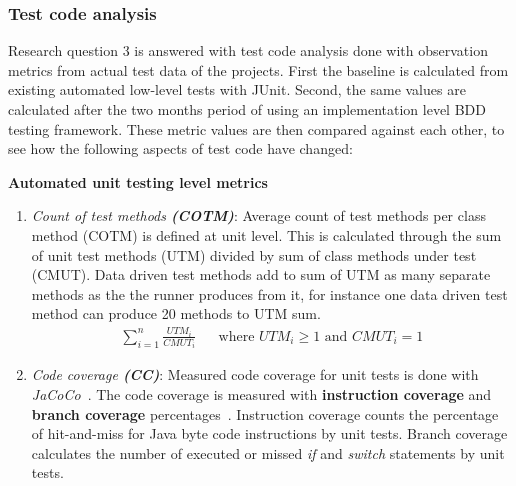     \subsubsection{Test code analysis}
    \label{subsub:test}
    Research question 3 is answered with test code analysis done with observation metrics from actual test data of the projects.
    First the baseline is calculated from existing automated low-level tests with JUnit. Second, the same values are calculated
    after the two months period of using an implementation level BDD testing framework. These metric values are then compared
    against each other, to see how the following aspects of test code have changed:
    \clearpage
    \begin{addmargin}[0em]{0em}
    \vspace{10px}
    \textbf{Automated unit testing level metrics}
    \vspace{5px}
    \newline
    \begin{enumerate}
    \item \textit{Count of test methods \textbf{(COTM)}}:
    Average count of test methods per class method (COTM) is defined at unit level. This is calculated through the sum
    of unit test methods (UTM) divided by sum of class methods under test (CMUT). Data driven test methods add to sum of UTM as
    many separate methods as the the runner produces from it, for instance one data driven test method can produce 20 methods to UTM sum.
    \begin{align*}
        \sum_{i=1}^{n}\frac{UTM_{i}}{CMUT_{i}} && \text {where } UTM_{i} \geq 1 \text{ and } CMUT_{i} = 1
    \end{align*}
    \item \textit{Code coverage \textbf{(CC)}}:
    Measured code coverage for unit tests is done with \textit{JaCoCo}~\cite{jacoco}. The code coverage is measured with
    \textbf{instruction coverage} and \textbf{branch coverage} percentages~\cite{jacoco-coverage}. Instruction coverage counts the percentage
    of hit-and-miss for Java byte code instructions by unit tests. Branch coverage calculates the number of executed or missed \textit{if}
    and \textit{switch} statements by unit tests.
    \end{enumerate}
    \end{addmargin}

